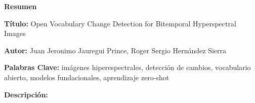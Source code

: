 \clearpage
\begin{center}\textbf{Resumen}\end{center}

\noindent\textbf{Título:} Open Vocabulary Change Detection for Bitemporal Hyperspectral Images

\noindent\textbf{Autor:} Juan Jeronimo Jauregui Prince, Roger Sergio Hernández Sierra

\noindent\textbf{Palabras Clave:} imágenes hiperespectrales, detección de cambios, vocabulario abierto, modelos fundacionales, aprendizaje zero-shot

\noindent\textbf{Descripción:} 

